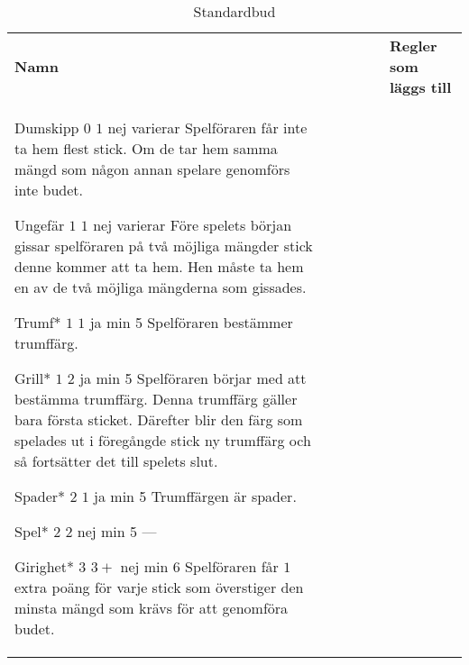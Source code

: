 %
%
%

\begin{table}
	\caption{Standardbud}\label{tab:standardBids}
	\begin{center}
		\begin{tabularx}{\textwidth}{lcccc|X}
				\textbf{Namn} &
				\rotccw{\textbf{Värde}} &
				\rotccw{\textbf{Poäng}} &
				\rotccw{\textbf{Trumf}} &
				\rotccw{\textbf{Stick}} &
				\textbf{Regler som läggs till}
				\\[-3ex]

				\standardBidItem%
				{Dumskipp}
				{$0$}
				{$1$}
				{nej}
				{varierar}
				{%
					Spelföraren får inte ta hem flest stick. Om de tar hem samma mängd som någon annan spelare genomförs inte budet.
				}

				\standardBidItem%
				{Ungefär}
				{$1$}
				{$1$}
				{nej}
				{varierar}
				{%
					Före spelets början gissar spelföraren på två möjliga mängder stick denne kommer att ta hem. Hen måste ta hem en av de två möjliga mängderna som gissades.
				}

				\standardBidItem%
				{Trumf*}
				{$1$}
				{$1$}
				{ja}
				{min 5}
				{%
					Spelföraren bestämmer trumffärg.
				}

				\standardBidItem%
				{Grill*}
				{$1$}
				{$2$}
				{ja}
				{min 5}
				{%
					Spelföraren börjar med att bestämma trumffärg. Denna trumffärg gäller bara första sticket. Därefter blir den färg som spelades ut i föregångde stick ny trumffärg och så fortsätter det till spelets slut.
				}
				
				\standardBidItem%
				{Spader*}
				{$2$}
				{$1$}
				{ja}
				{min 5}
				{%
					Trumffärgen är spader.
				}

				\standardBidItem%
				{Spel*}
				{$2$}
				{$2$}
				{nej}
				{min 5}
				{%
					---
				}

				\standardBidItem%
				{Girighet*}
				{$3$}
				{$3+$}
				{nej}
				{min 6}
				{%
					Spelföraren får $1$ extra poäng för varje stick som överstiger den minsta mängd som krävs för att genomföra budet.
				}


\end{tabularx}
\end{center}
\end{table}
